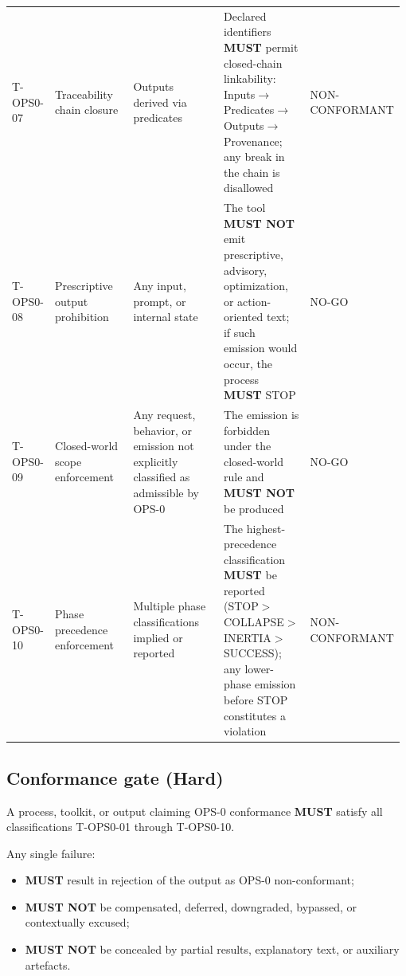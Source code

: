 \begin{center}
\begin{tabular}{p{0.11\linewidth} p{0.23\linewidth} p{0.28\linewidth} p{0.26\linewidth} p{0.10\linewidth}}
T-OPS0-07 &
Traceability chain closure &
Outputs derived via predicates &
Declared identifiers \textbf{MUST} permit
closed-chain linkability:
Inputs$\rightarrow$Predicates$\rightarrow$Outputs$\rightarrow$Provenance;
any break in the chain is disallowed &
NON-CONFORMANT \\

T-OPS0-08 &
Prescriptive output prohibition &
Any input, prompt, or internal state &
The tool \textbf{MUST NOT} emit prescriptive,
advisory, optimization,
or action-oriented text;
if such emission would occur,
the process \textbf{MUST} STOP &
NO-GO \\

T-OPS0-09 &
Closed-world scope enforcement &
Any request, behavior, or emission
not explicitly classified as admissible
by OPS-0 &
The emission is forbidden under the
closed-world rule and \textbf{MUST NOT}
be produced &
NO-GO \\

T-OPS0-10 &
Phase precedence enforcement &
Multiple phase classifications implied
or reported &
The highest-precedence classification
\textbf{MUST} be reported
(STOP$>$COLLAPSE$>$INERTIA$>$SUCCESS);
any lower-phase emission before STOP
constitutes a violation &
NON-CONFORMANT \\

\hline
\end{tabular}
\end{center}

\subsection{Conformance gate (Hard)}
A process, toolkit, or output
claiming OPS-0 conformance
\textbf{MUST} satisfy all classifications
T-OPS0-01 through T-OPS0-10.

Any single failure:
\begin{itemize}
  \item \textbf{MUST} result in rejection
        of the output as OPS-0 non-conformant;
  \item \textbf{MUST NOT} be compensated,
        deferred, downgraded, bypassed,
        or contextually excused;
  \item \textbf{MUST NOT} be concealed
        by partial results,
        explanatory text,
        or auxiliary artefacts.
\end{itemize}
